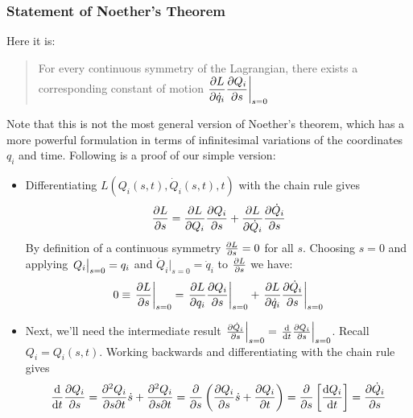 \documentclass[11pt, a4paper]{article}
\begin{document}
\subsubsection{Statement of Noether's Theorem}
Here it is:
\begin{quote}
	For every continuous symmetry of the Lagrangian, there exists a corresponding constant of motion $ \displaystyle{\pdv{L}{\dot{q}_i} \pdv{Q_i}{s} \bigg |_{s=0}} $
\end{quote}	
Note that this is not the most general version of Noether's theorem, which has a more powerful formulation in terms of infinitesimal variations of the coordinates $ q_{i} $ and time. Following is a proof of our simple version:

\begin{itemize}
	\item Differentiating $ L\left (Q_i(s, t), \dot{Q}_i(s, t), t\right ) $ with the chain rule gives
	\begin{equation*}
		\pdv{L}{s} = \pdv{L}{Q_{i}} \pdv{Q_{i}}{s} + \pdv{L}{\dot{Q}_{i}} \pdv{\dot{Q}_{i}}{s}
	\end{equation*}
	By definition of a continuous symmetry $ \pdv{L}{s} = 0 $ for all $ s $. Choosing $ s = 0 $ and applying $ \eval{Q_{i}}_{s=0} = q_{i} $ and $  \dot{Q}_{i} \big |_{s=0} = \dot{q}_{i} $ to $ \pdv{L}{s} $ we have:
	\begin{equation*}
		0 \equiv \eval{\pdv{L}{s}}_{s=0} = \eval{\pdv{L}{q_{i}} \pdv{Q_{i}}{s}}_{s=0} + \eval{\pdv{L}{\dot{q}_{i}} \pdv{\dot{Q}_{i}}{s}}_{s=0}
	\end{equation*}
	
	\item Next, we'll need the intermediate result $ \eval{\pdv{\dot{Q}_{i}}{s}}_{s=0} = \eval{\dv{}{t}\pdv{Q_{i}}{s}}_{s=0} $. Recall $ Q_{i} = Q_{i}(s, t) $. Working backwards and differentiating with the chain rule gives
	\begin{equation*}
		\dv{}{t} \pdv{Q_{i}}{s} = \pdv{Q_{i}}{s}{t} \dot{s} + \pdv{Q_{i}}{s}{t} = \pdv{}{s}\left(\pdv{Q_{i}}{s} \dot{s} + \pdv{Q_{i}}{t}\right) = \pdv{}{s}\left[\dv{Q_{i}}{t}\right] = \pdv{\dot{Q}_{i}}{s}
	\end{equation*}
	

\end{itemize}
\end{document}
